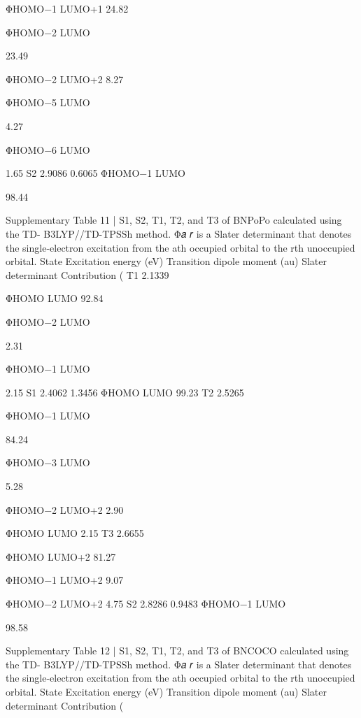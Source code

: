 ΦHOMO−1
LUMO+1 
24.82 
 
 
 
ΦHOMO−2
LUMO
 
23.49 
 
 
 
ΦHOMO−2
LUMO+2 
8.27 
 
 
 
ΦHOMO−5
LUMO
 
4.27 
 
 
 
ΦHOMO−6
LUMO
 
1.65 
S2 
2.9086 
0.6065 
ΦHOMO−1
LUMO
 
98.44 
 
 
Supplementary Table 11 | S1, S2, T1, T2, and T3 of BNPoPo calculated using the TD-
B3LYP//TD-TPSSh method. Φ𝑎
𝑟 is a Slater determinant that denotes the single-electron 
excitation from the ath occupied orbital to the rth unoccupied orbital. 
State 
Excitation 
energy (eV) 
Transition dipole  
moment (au) 
Slater 
determinant 
Contribution (%
T1 
2.1339 
 
ΦHOMO
LUMO       
92.84 
 
 
 
ΦHOMO−2
LUMO
 
2.31 
 
 
 
ΦHOMO−1
LUMO
 
2.15 
S1 
2.4062 
1.3456 
ΦHOMO
LUMO 
99.23 
T2 
2.5265 
 
ΦHOMO−1
LUMO
 
84.24 
 
 
 
ΦHOMO−3
LUMO
 
5.28 
 
 
 
ΦHOMO−2
LUMO+2 
2.90 
 
 
 
ΦHOMO
LUMO 
2.15 
T3 
2.6655 
 
ΦHOMO
LUMO+2 
81.27 
 
 
 
ΦHOMO−1
LUMO+2 
9.07 
 
 
 
ΦHOMO−2
LUMO+2 
4.75 
S2 
2.8286 
0.9483 
ΦHOMO−1
LUMO
 
98.58 
 
 
Supplementary Table 12 | S1, S2, T1, T2, and T3 of BNCOCO calculated using the TD-
B3LYP//TD-TPSSh method. Φ𝑎
𝑟 is a Slater determinant that denotes the single-electron 
excitation from the ath occupied orbital to the rth unoccupied orbital. 
State 
Excitation 
energy (eV) 
Transition dipole  
moment (au) 
Slater 
determinant 
Contribution (%


